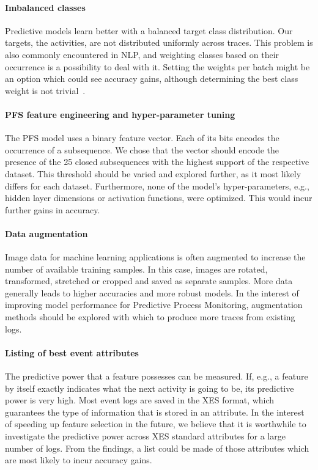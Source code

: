 \paragraph{Imbalanced classes} Predictive models learn better with a balanced target class distribution.
Our targets, the activities, are not distributed uniformly across traces.
This problem is also commonly encountered in NLP, and weighting classes based on their occurrence is a possibility to deal with it.
Setting the weights per batch might be an option which could see accuracy gains, although determining the best class weight is not trivial~\cite{web:stackoverflow-keras-class-weights}.

\paragraph{PFS feature engineering and hyper-parameter tuning} The PFS model uses a binary feature vector.
Each of its bits encodes the occurrence of a subsequence.
We chose that the vector should encode the presence of the 25 closed subsequences with the highest support of the respective dataset.
This threshold should be varied and explored further, as it most likely differs for each dataset.
Furthermore, none of the model's hyper-parameters, e.g., hidden layer dimensions or activation functions, were optimized.
This would incur further gains in accuracy.

\paragraph{Data augmentation} Image data for machine learning applications is often augmented to increase the number of available training samples.
In this case, images are rotated, transformed, stretched or cropped and saved as separate samples.
More data generally leads to higher accuracies and more robust models.
In the interest of improving model performance for Predictive Process Monitoring, augmentation methods should be explored with which to produce more traces from existing logs.

\paragraph{Listing of best event attributes} The predictive power that a feature possesses can be measured.
If, e.g., a feature by itself exactly indicates what the next activity is going to be, its predictive power is very high.
Most event logs are saved in the XES format, which guarantees the type of information that is stored in an attribute.
In the interest of speeding up feature selection in the future, we believe that it is worthwhile to investigate the predictive power across XES standard attributes for a large number of logs.
From the findings, a list could be made of those attributes which are most likely to incur accuracy gains.

